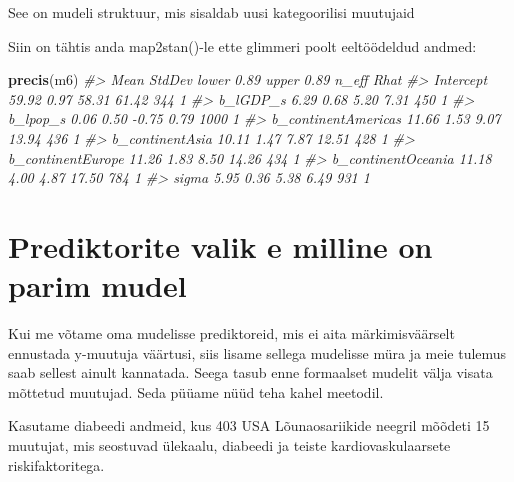 \documentclass[]{book}
\newenvironment{Shaded}{\begin{snugshade}}{\end{snugshade}}
\newcommand{\CommentTok}[1]{\textcolor[rgb]{0.56,0.35,0.01}{\textit{#1}}}
\newcommand{\DataTypeTok}[1]{\textcolor[rgb]{0.13,0.29,0.53}{#1}}
\newcommand{\KeywordTok}[1]{\textcolor[rgb]{0.13,0.29,0.53}{\textbf{#1}}}
\newcommand{\NormalTok}[1]{#1}
\newcommand{\OperatorTok}[1]{\textcolor[rgb]{0.81,0.36,0.00}{\textbf{#1}}}
\newcommand{\StringTok}[1]{\textcolor[rgb]{0.31,0.60,0.02}{#1}}
\begin{document}
See on mudeli struktuur, mis sisaldab uusi kategoorilisi muutujaid

Siin on tähtis anda map2stan()-le ette glimmeri poolt eeltöödeldud andmed:

\begin{Shaded}
\end{Shaded}

\begin{Shaded}
\begin{Highlighting}[]
\KeywordTok{precis}\NormalTok{(m6)}
\CommentTok{#>                      Mean StdDev lower 0.89 upper 0.89 n_eff Rhat}
\CommentTok{#> Intercept           59.92   0.97      58.31      61.42   344    1}
\CommentTok{#> b_lGDP_s             6.29   0.68       5.20       7.31   450    1}
\CommentTok{#> b_lpop_s             0.06   0.50      -0.75       0.79  1000    1}
\CommentTok{#> b_continentAmericas 11.66   1.53       9.07      13.94   436    1}
\CommentTok{#> b_continentAsia     10.11   1.47       7.87      12.51   428    1}
\CommentTok{#> b_continentEurope   11.26   1.83       8.50      14.26   434    1}
\CommentTok{#> b_continentOceania  11.18   4.00       4.87      17.50   784    1}
\CommentTok{#> sigma                5.95   0.36       5.38       6.49   931    1}
\end{Highlighting}
\end{Shaded}

\hypertarget{prediktorite-valik-e-milline-on-parim-mudel}{%
\section{Prediktorite valik e milline on parim mudel}\label{prediktorite-valik-e-milline-on-parim-mudel}}

Kui me võtame oma mudelisse prediktoreid, mis ei aita märkimisväärselt ennustada y-muutuja väärtusi, siis lisame sellega mudelisse müra ja meie tulemus saab sellest ainult kannatada. Seega tasub enne formaalset mudelit välja visata mõttetud muutujad. Seda püüame nüüd teha kahel meetodil.

Kasutame diabeedi andmeid, kus 403 USA Lõunaosariikide neegril mõõdeti 15 muutujat, mis seostuvad ülekaalu, diabeedi ja teiste kardiovaskulaarsete riskifaktoritega.
\end{document}
